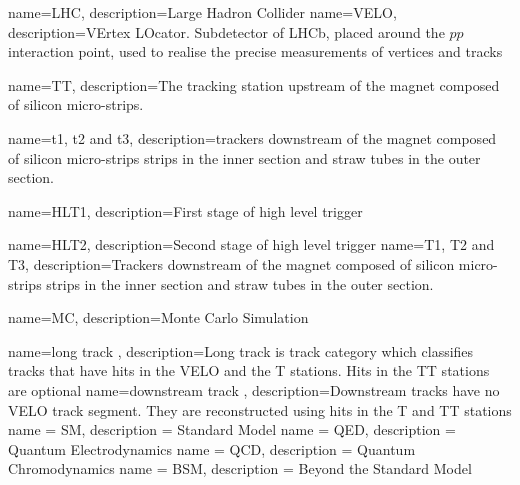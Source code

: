                  {
                   name=LHC,
                   description={Large Hadron Collider}
                 }
                 {
                   name=VELO,
                   description={VErtex LOcator. Subdetector of LHCb, placed around the $pp$ interaction point, used to realise the precise measurements of vertices and tracks}
                 }

	{
                   name=TT,
                   description={The tracking station upstream of the magnet composed of silicon micro-strips.}
        }


                 {
                   name=t1{,} t2 and t3,
                   description={trackers downstream of the magnet composed of silicon micro-strips strips in the inner section and straw tubes in the outer section.}
                 }

                 {
                   name=HLT1,
                   description={First stage of high level trigger}
                 }

                 {
                   name=HLT2,
                   description={Second stage of high level trigger}
                 }
                 {
                   name=T1{,} T2 and T3,
                   description={Trackers downstream of the magnet composed of silicon micro-strips strips in the inner section and straw tubes in the outer section.}
                 }

                 {
                   name=MC,
                   description={Monte Carlo Simulation}
                 }

              {
                   name=long track ,
                   description={Long track is track category which classifies tracks that have hits in the VELO and the T stations. Hits in the TT stations are optional}
              }
              {
                   name=downstream track ,
                   description={Downstream tracks have no VELO track segment. They are reconstructed using hits in the T and TT stations}
              }
                 {      
                 name = SM,
                 description = {Standard Model}     
                 }
                 {      
                 name = QED,
                 description = {Quantum Electrodynamics}     
                 }
                 {      
                 name = QCD,
                 description = {Quantum Chromodynamics}     
                 }
                 {      
                 name = BSM,
                 description = {Beyond the Standard Model}     
                 }
                  
